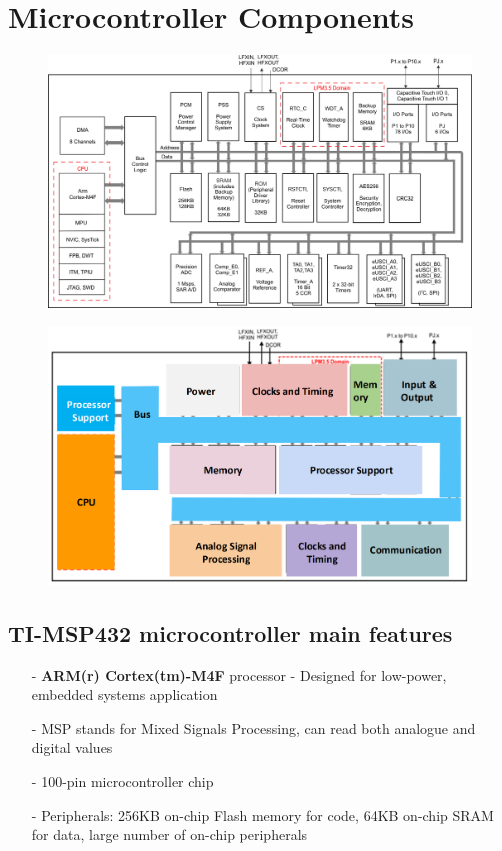 \section{Microcontroller Components}



\begin{figure}[H]
    \centering
    \includegraphics[width=1\linewidth]{img/MSP432P401M-functional-block-diagram.png}
\end{figure}

\begin{figure}[H]
    \centering
    \includegraphics[width=1\linewidth]{img/image53.png}
\end{figure}

\newpage
\subsection{TI-MSP432 microcontroller main features}

\begin{itemize}
    \item[-] \textbf{ARM(r) Cortex(tm)-M4F} processor - Designed for low-power, embedded systems application
    \item[-] MSP stands for Mixed Signals Processing, can read both analogue and digital values
    \item[-] 100-pin microcontroller chip
    \item[-] Peripherals: 256KB on-chip Flash memory for code, 64KB on-chip SRAM for data, large number of on-chip peripherals
\end{itemize}


